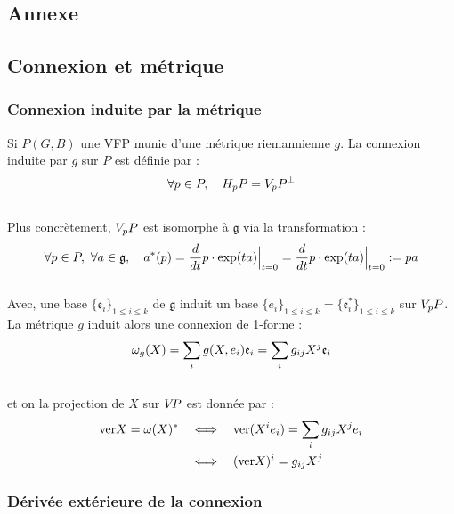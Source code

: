 


\begin{annexe}

\section{Annexe}

\subsection{Connexion et métrique} \label{ann:conn2submer_riemanian}

\subsubsection{Connexion induite par la métrique}

Si $P(G,B)$ une VFP munie d'une métrique riemannienne $g$. La connexion induite par $g$ sur $P$ est définie par :
\begin{equation}
	\forall p\in P,\quad \hg[p]{P} = \vg[p]{P}^\perp
\end{equation}
\\
Plus concrètement, $\vg[p]{P}$ est isomorphe à $\mathfrak{g}$ via la transformation :
\[\forall p\in P,\ \forall a\in\mathfrak{g},\quad a^*(p) = \frac{d}{dt} p\cdot \exp(t a)\Big|_{t=0} = \frac{d}{dt} p\cdot \exp(t a)\Big|_{t=0}\defeq pa\]
\\
Avec, une base $\{\mathfrak{e}_i\}_{1\leq i\leq k}$ de $\mathfrak{g}$ induit un base $\{e_i\}_{1\leq i\leq k} = \{\mathfrak{e}^*_i\}_{1\leq i\leq k}$ sur $\vg[p]{P}$. La métrique $g$ induit alors une connexion de 1-forme :
\[\conn_g(X) = \sum_i g(X, e_i) \mathfrak{e}_i = \sum_i g_{ij}X^j \mathfrak{e}_i\]
\\
et on la projection de $X$ sur $\vg{P}$ est donnée par :
\begin{align*}
	\ver X = \conn(X)^*\quad &\Llr\quad  \ver (X^ie_i) = \sum_i g_{ij}X^j e_i \\
	&\Llr\quad  (\ver X)^i = g_{ij}X^j
\end{align*}

\subsubsection{Dérivée extérieure de la connexion}


\end{annexe}
